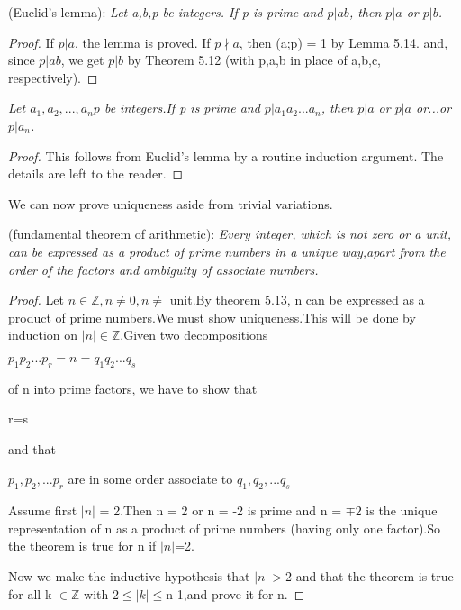 \documentclass[11pt]{amsbook}
\begin{document}
\begin{lemma}(Euclid's lemma): 
\textit{Let a,b,p be integers. If p is prime and $p| ab$, then $p|a$ or $p|b$.}
\end{lemma}
\begin{proof}
If $p|a$, the lemma is proved. If $p\nmid a$, then (a;p) = 1 by Lemma 5.14. and, since $p|ab$, we get $p|b$ by Theorem 5.12 (with p,a,b in place of a,b,c, respectively). 
\end{proof}
\begin{lemma}
\textit{Let $a_{1},a_{2}, ... ,a_{n}p$ be integers.If p is prime and $p|a_{1}a_{2}...a_{n}$, then $p|a$ or $p|a$ or...or $p|a_{n}$.
}
\end{lemma}
\begin{proof}
This follows from Euclid's lemma by a routine induction argument. The details are left  to the reader.
\end{proof}

We can now prove uniqueness aside from trivial variations.

\begin{theorem}(fundamental theorem of arithmetic):
\textit{Every integer, which is not zero or a unit, can be expressed as a product of prime numbers in a unique way,apart from the order of the factors and ambiguity of associate numbers.}
\end{theorem}
\begin{proof}
Let $n\in \mathbb{Z}, n\neq 0, n\neq$ unit.By theorem 5.13, n can be expressed as a product of prime numbers.We must show uniqueness.This will be done by induction on $|n| \in \mathbb{Z} $.Given two decompositions 

\begin{center}
$p_{1}p_{2}...p_{r}=n=q_{1}q_{2}...q_{s}$
\end{center}

of n into prime factors, we have to show that

\begin{center}
r=s
\end{center}

and that 

\begin{center}
$p_{1},p_{2},...p_{r}$ are in some order associate to $q_{1},q_{2},...q_{s}$
\end{center}

Assume first $|n|$ = 2.Then n = 2 or n = -2 is prime and n = $\mp2$ is the unique representation of n as a product of prime numbers (having only one factor).So the theorem is true for n if $|n|$=2.

Now we make the inductive hypothesis that $|n|>$2 and that the theorem is true for all k $\in \mathbb{Z}$ with $2\leqslant |k| \leqslant$n-1,and prove it for n.
\end{proof}
\end{document}
